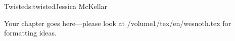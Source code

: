 \begin{aosachapter}{Twisted}{s:twisted}{Jessica McKellar}

Your chapter goes here---please look at /volume1/tex/en/wesnoth.tex for 
formatting ideas.

\end{aosachapter}
